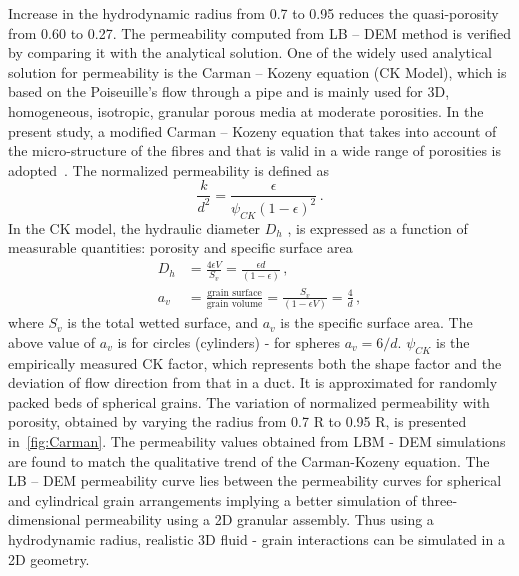 Increase in the hydrodynamic radius from 0.7 to 0.95 reduces the quasi-porosity 
from 0.60 to 0.27. The permeability computed from LB – DEM method is verified 
by comparing it with the analytical solution. One of the widely used analytical 
solution for permeability is the Carman – Kozeny equation (CK Model), 
which is based on the Poiseuille's flow through a pipe and is mainly used for 
3D, homogeneous, isotropic, granular porous media at moderate porosities. In 
the present study, a modified Carman – Kozeny equation that takes into account 
of the micro-structure of the fibres and that is valid in a wide range of 
porosities is adopted~\citep{Yazdchi2011}. The normalized permeability is 
defined as
\begin{equation}
\frac{k}{d^2} = \frac{\epsilon}{\psi_{CK}(1-\epsilon)^2} \,.
\end{equation}
%
In the CK model, the hydraulic diameter $D_h$ , is expressed as a function of 
measurable quantities: porosity and specific surface area
%
\begin{align}
D_h & = \frac{4\epsilon V}{S_v}=\frac{\epsilon d}{(1 - \epsilon)} \,, \\
a_v & = \frac{\mbox{grain surface}}{\mbox{grain volume}} = 
\frac{S_v}{(1-\epsilon V)} = \frac{4}{d} \,,
\end{align}
%
where $S_v$ is the total wetted surface, and $a_v$ is the specific surface 
area. The above value of $a_v$ is for circles (cylinders) - for spheres $a_v = 
6/d$. $\psi_{CK}$ is the empirically  measured CK factor, which represents both 
the shape factor and the deviation of flow direction from that in a duct. It is 
approximated for randomly packed beds of spherical grains. The variation of 
normalized permeability with porosity, obtained by varying the radius from 0.7 R
to 0.95 R, is presented in~\cref{fig:Carman}. The permeability values obtained 
from LBM - DEM simulations are found to match the qualitative trend of the 
Carman-Kozeny equation. The LB – DEM permeability curve lies between the 
permeability curves for spherical and cylindrical grain arrangements implying a 
better simulation of three-dimensional permeability using a 2D granular 
assembly. Thus using a hydrodynamic radius, realistic 3D fluid - grain 
interactions can be simulated in a 2D geometry.

